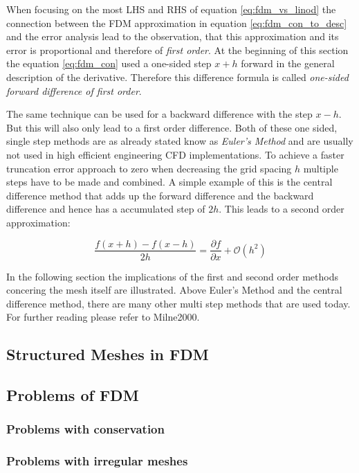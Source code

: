 When focusing on the most LHS and RHS of equation \ref{eq:fdm_vs_linod} the connection between the FDM approximation in equation \ref{eq:fdm_con_to_desc}
and the error analysis lead to the observation, that this approximation and its error is proportional and therefore of \emph{first order}. At the beginning of this section the equation \ref{eq:fdm_con} used a one-sided step $x+h$ forward in the general description of the derivative. Therefore this difference formula is called \emph{one-sided forward difference of first order}.

The same technique can be used for a backward difference with the step $x-h$. But this will also only lead to a first order difference. Both of these one sided, single step methods are as already stated know as \emph{Euler's Method} and are usually not used in high efficient engineering CFD implementations. To achieve a faster truncation error approach to zero when decreasing the grid spacing $h$ multiple steps have to be made and combined. A simple example of this is the central difference method that adds up the forward difference and the backward difference and hence has a accumulated step of $2h$. This leads to a second order
approximation:

\begin{equation}\label{eq:fdm_centraldiff}
\frac {f(x+h) - f(x-h)}{2h} = 
\frac{\partial f}{\partial x} + \mathcal{O}(h^2)
\end{equation}

In the following section the implications of the first and second order methods concering the mesh itself are illustrated. Above Euler's Method and the central difference method, there are many other multi step methods that are used today. For further reading please refer to Milne2000.


\subsection{Structured Meshes in FDM}

\subsection{Problems of FDM}
\label{sec:problems_of_fdm}
\subsubsection{Problems with conservation}
\subsubsection{Problems with irregular meshes}



